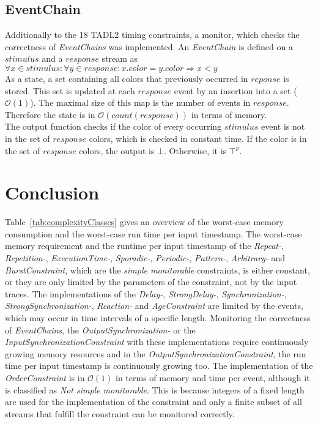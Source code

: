 \subsection{EventChain}
	Additionally to the 18 TADL2 timing constraints, a monitor, which checks the correctness of \textit{EventChains} was implemented. An \textit{EventChain} is defined on a $stimulus$ and a $response$ stream as\\[10pt]
	$\forall x \in stimulus:\forall y\in response: x.color=y.color\Rightarrow x<y$\\[10pt]
	As a state, a set containing all colors that previously occurred in $reponse$ is stored. This set is updated at each $response$  event by an insertion into a set ($\mathcal{O}(1)$). The maximal size of this map is the number of events in $response$. Therefore the state is in $\mathcal{O}(count(response))$ in terms of memory.\\
	The output function checks if the color of every occurring $stimulus$ event is not in the set of $response$ colors, which is checked in constant time. If the color is in the set of $response$ colors, the output is $\bot$. Otherwise, it is $\top^p$.
	
\section{Conclusion}
Table~\ref{tab:complexityClasses} gives an overview of the worst-case memory consumption and the worst-case run time per input timestamp. The worst-case memory requirement and the runtime per input timestamp of the \textit{Repeat-}, \textit{Repetition-}, \textit{ExecutionTime-}, \textit{Sporadic-}, \textit{Periodic-}, \textit{Pattern-}, \textit{Arbitrary-} and \textit{BurstConstraint}, which are the \textit{simple monitorable} constraints, is either constant, or they are only limited by the parameters of the constraint, not by the input traces. The implementations of the \textit{Delay-}, \textit{StrongDelay-}, \textit{Synchronization-}, \textit{StrongSynchronization-}, \textit{Reaction-} and \textit{AgeConstraint} are limited by the events, which may occur in time intervals of a specific length. Monitoring the correctness of \textit{EventChains}, the \textit{OutputSynchronization-} or the \textit{InputSynchronizationConstraint} with these implementations require continuously growing memory resources and in the \textit{OutputSynchronizationConstraint}, the run time per input timestamp is continuously growing too. The implementation of the \textit{OrderConstraint} is in $\mathcal{O}(1)$ in terms of memory and time per event, although it is classified as \textit{Not simple monitorable}. This is because integers of a fixed length are used for the implementation of the constraint and only a finite subset of all streams that fulfill the constraint can be monitored correctly.

